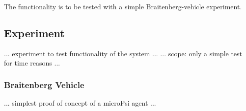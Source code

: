 The functionality is to be tested with a simple Braitenberg-vehicle experiment.

\subsection{Experiment}
... experiment to test functionality of the system ...
... scope: only a simple test for time reasons ...

\subsubsection{Braitenberg Vehicle}
... simplest proof of concept of a microPsi agent ...